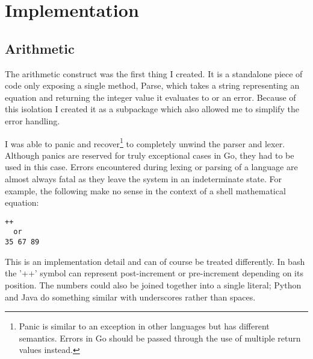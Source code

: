 \chapter{Implementation}




\section{Arithmetic}
The arithmetic construct was the first thing I created.
It is a standalone piece of code only exposing a single method, Parse, which takes a string representing an equation and returning the integer value it evaluates to or an error.
Because of this isolation I created it as a subpackage which also allowed me to simplify the error handling.

I was able to panic and recover\footnote{Panic is similar to an exception in other languages but has different semantics. Errors in Go should be passed through the use of multiple return values instead.} to completely unwind the parser and lexer.
Although panics are reserved for truly exceptional cases in Go, they had to be used in this case.
Errors encountered during lexing or parsing of a language are almost always fatal as they leave the system in an indeterminate state.
For example, the following make no sense in the context of a shell mathematical equation:
\begin{verbatim}
++
  or
35 67 89
\end{verbatim}
This is an implementation detail and can of course be treated differently.
In bash the '++' symbol can represent post-increment or pre-increment depending on its position.
The numbers could also be joined together into a single literal; Python and Java do something similar with underscores rather than spaces\cite{UNDERSCORE-NUM-LITERAL}.

